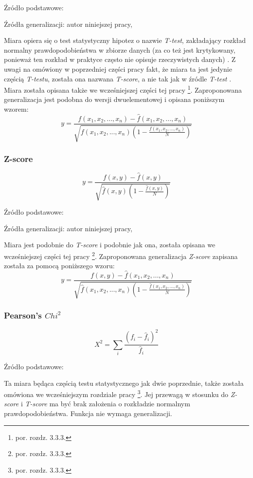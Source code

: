 Źródło podstawowe: \cite[str. 18]{pecina_measures}
\par
Źródła generalizacji: autor niniejszej pracy, \cite{generalization_patterns}
\par
Miara opiera się o test statystyczny hipotez o nazwie \emph{T-test}, zakładający rozkład normalny prawdopodobieństwa w zbiorze danych (za co też jest krytykowany, ponieważ ten rozkład w praktyce często nie opisuje rzeczywistych danych) \cite[str. 169]{mit}.
Z uwagi na omówiony w poprzedniej części pracy fakt, że miara ta jest jedynie częścią \emph{T-testu}, została ona nazwana \emph{T-score}, a nie tak jak w źródle \emph{T-test} \cite[str. 18]{pecina_measures}.
Miara została opisana także we wcześniejszej części tej pracy \footnote{por. rozdz. 3.3.3.}.
Zaproponowana generalizacja jest podobna do wersji dwuelementowej i opisana poniższym wzorem:
$$ y = \frac{ f(x_{1}, x_{2}, ..., x_{n}) - \hat{f}(x_{1}, x_{2}, ..., x_{n}) }{ \sqrt{ f(x_{1}, x_{2}, ..., x_{n})(1 - \frac{f(x_{1}, x_{2}, ..., x_{n})}{N})} } $$

\subsubsection{Z-score}
$$ y = \frac{ f(x, y) - \hat{f}(x, y) }{ \sqrt{ \hat{f}(x, y)(1 - \frac{\hat{f}(x, y)}{N}) } } $$

Źródło podstawowe: \cite[str. 18]{pecina_measures}
\par
Źródła generalizacji: autor niniejszej pracy, \cite{generalization_patterns}
\par
Miara jest podobnie do \emph{T-score} i podobnie jak ona, została opisana we wcześniejszej części tej pracy \footnote{por. rozdz. 3.3.3.}.
Zaproponowana generalizacja \emph{Z-score} zapisana została za pomocą poniższego wzoru:
$$ y = \frac{ f(x, y) - \hat{f}(x_{1}, x_{2}, ..., x_{n}) }{ \sqrt{ \hat{f}(x_{1}, x_{2}, ..., x_{n})(1 - \frac{\hat{f}(x_{1}, x_{2}, ..., x_{n})}{N}) } } $$

\subsubsection{Pearson's \(Chi^{2}\)}
$$ X^2 = \sum_{i}\frac{(f_{i} - \hat{f}_{i})^2}{\hat{f}_{i}} $$

Źródło podstawowe: \cite[str. 18]{pecina_measures} 
\par
Ta miara będąca częścią testu statystycznego jak dwie poprzednie, także została omówiona we wcześniejszym rozdziale pracy \footnote{por. rozdz. 3.3.3.}.
Jej przewagą w stosunku do \emph{Z-score} i \emph{T-score} ma być brak założenia o rozkładzie normalnym prawdopodobieństwa.
Funkcja nie wymaga generalizacji.

